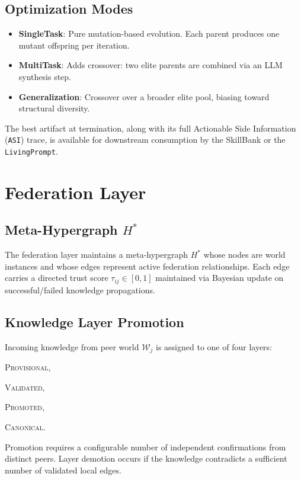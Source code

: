 \documentclass[11pt]{article}
\begin{document}
\subsection{Optimization Modes}

\begin{itemize}[noitemsep,topsep=4pt]
  \item \textbf{SingleTask}: Pure mutation-based evolution. Each parent produces
        one mutant offspring per iteration.
  \item \textbf{MultiTask}: Adds crossover: two elite parents are combined via
        an LLM synthesis step.
  \item \textbf{Generalization}: Crossover over a broader elite pool, biasing
        toward structural diversity.
\end{itemize}

The best artifact at termination, along with its full Actionable Side Information
(\texttt{ASI}) trace, is available for downstream consumption by the SkillBank or
the \texttt{LivingPrompt}.

\section{Federation Layer}
\label{sec:federation}

\subsection[Meta-Hypergraph H*]{Meta-Hypergraph $H^*$}

The federation layer maintains a meta-hypergraph $H^*$ whose nodes are world
instances and whose edges represent active federation relationships. Each edge
carries a directed trust score $\tau_{ij} \in [0,1]$ maintained via Bayesian
update on successful/failed knowledge propagations.

\subsection{Knowledge Layer Promotion}

Incoming knowledge from peer world $\mathcal{W}_j$ is assigned to one of four
layers:
\begin{enumerate*}[label=(\roman*)]
  \item \textsc{Provisional},
  \item \textsc{Validated},
  \item \textsc{Promoted},
  \item \textsc{Canonical}.
\end{enumerate*}
Promotion requires a configurable number of independent confirmations from
distinct peers. Layer demotion occurs if the knowledge contradicts a sufficient
number of validated local edges.
\end{document}
